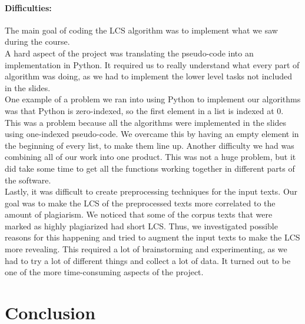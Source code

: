 \documentclass[a4paper,12pt]{article}
\begin{document}
		\paragraph{Difficulties:} The main goal of coding the LCS algorithm was to implement what we saw during the course.\\
  A hard aspect of the project was translating the pseudo-code into an implementation in Python. It required us to really understand what every part of algorithm was doing, as we had to implement the lower level tasks not included in the slides.\\
  One example of a problem we ran into using Python to implement our algorithms was that Python is zero-indexed, so the first element in a list is indexed at 0. This was a problem because all the algorithms were implemented in the slides using one-indexed pseudo-code. We overcame this by having an empty element in the beginning of every list, to make them line up. Another difficulty we had was combining all of our work into one product. This was not a huge problem, but it did take some time to get all the functions working together in different parts of the software.\\
  Lastly, it was difficult to create preprocessing techniques for the input texts. Our goal was to make the LCS of the preprocessed texts more correlated to the amount of plagiarism. We noticed that some of the corpus texts that were marked as highly plagiarized had short LCS. Thus, we investigated possible reasons for this happening and tried to augment the input texts to make the LCS more revealing. This required a lot of brainstorming and experimenting, as we had to try a lot of different things and collect a lot of data. It turned out to be one of the more time-consuming aspects of the project.

	\newpage
	\section{Conclusion}
\end{document}
